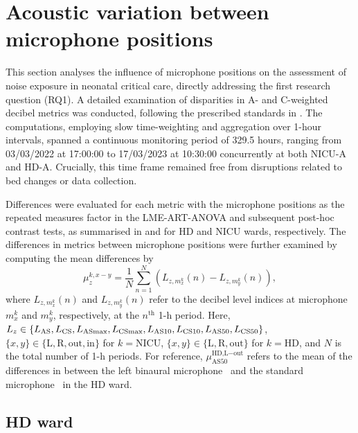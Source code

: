\section{Acoustic variation between microphone positions}
\label{sec:diff_mic}

This section analyses the influence of microphone positions on the assessment of noise exposure in neonatal critical care, directly addressing the first research question (RQ1). A detailed examination of disparities in A- and C-weighted decibel metrics was conducted, following the prescribed standards in . The computations, employing slow time-weighting and aggregation over 1-hour intervals, spanned a continuous monitoring period of 329.5 hours, ranging from 03/03/2022 at 17:00:00 to 17/03/2023 at 10:30:00 concurrently at both NICU-A and HD-A. Crucially, this time frame remained free from disruptions related to bed changes or data collection.

Differences were evaluated for each metric with the microphone positions as the repeated measures factor in the LME-ART-ANOVA and subsequent post-hoc contrast tests, as summarised in  and  for HD and NICU wards, respectively. The differences in metrics between microphone positions were further examined by computing the mean differences by
\begin{equation}
    \mu^{k,x-y}_{z}=\frac{1}{N}\sum^{N}_{n=1}(L_{z,m_x^k}(n) - L_{z,m_y^k}(n)),   
\end{equation}
where $L_{z,m_x^k}(n)$ and $L_{z,m_y^k}(n)$ refer to the decibel level indices at microphone $m_x^k$ and $m_y^k$, respectively, at the $n^\text{th}$ 1-\si{\hour} period. Here, $L_z \in \{L_\text{AS}, L_\text{CS}, L_\text{ASmax}, L_\text{CSmax}, L_\text{AS10}, L_\text{CS10}, L_\text{AS50}, \\L_\text{CS50}\}$, $\{x,y\}\in\{\text{L},\text{R},\text{out},\text{in}\}$ for $k=\text{NICU}$, $\{x,y\}\in\{\text{L},\text{R},\text{out}\}$ for $k=\text{HD}$, and $N$ is the total number of 1-\si{\hour} periods. For reference, $\mu^{{\text{HD,L}-\text{out}}}_{\text{AS50}}$ refers to the mean of the differences in  between the left binaural microphone \HDbinL\ and the standard microphone \HDGRAS\ in the HD ward.



\subsection{HD ward}

